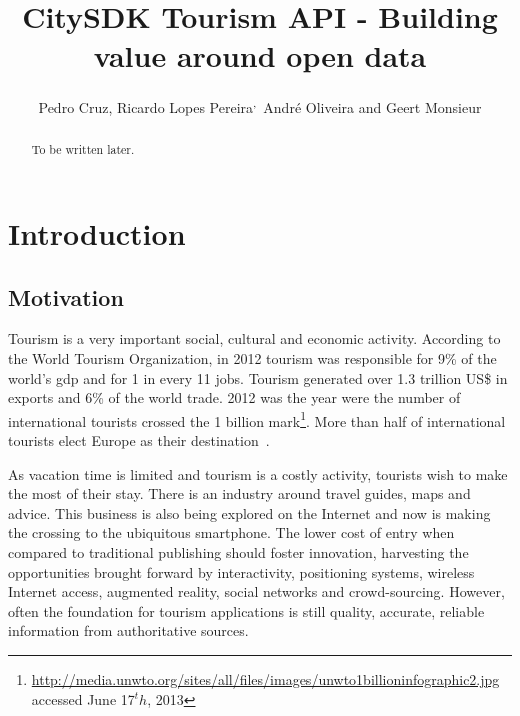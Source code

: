 \documentclass[times]{ettauth}
\begin{document}




\title{CitySDK Tourism API - Building value around open data}
\author{Pedro Cruz,
Ricardo Lopes Pereira\textsuperscript{,}\corrauth\,
Andr\'e Oliveira and 
Geert Monsieur}
\address{
 Instituto Superior T\'ecnico, Avenida Rovisco Pais 1, 1049-001 Lisboa, Portugal\\
 INESC-ID, Av. Prof. Dr. Cavaco Silva, 2744-016 Porto Salvo, Portugal\\
 ISA - Intelligent Sensing Anywhere S.A, Rua D. Manuel I, 30, 3030-320 Coimbra, Portugal\\
 European Research Institute in Service Science (ERISS), Tilburg University, Warandelaan 2, 5037AB Tilburg, The Netherlands
}

\begin{abstract}
To be written later.
\end{abstract}

\maketitle

\acresetall
\section{Introduction}

\subsection{Motivation}
\label{s:motivation}
Tourism is a very important social, cultural and economic activity.
According to the World Tourism Organization, in 2012 tourism was responsible for 9\% of the world's \ac{gdp} and for 1 in every 11 jobs.
Tourism generated over 1.3 trillion US\$ in exports and 6\% of the world trade.
2012 was the year were the number of international tourists crossed the 1 billion mark\footnote{\url{http://media.unwto.org/sites/all/files/images/unwto1billioninfographic2.jpg} accessed June 17$^th$, 2013}.
More than half of international tourists elect Europe as their destination~\cite{unwto}.

As vacation time is limited and tourism is a costly activity, tourists wish to make the most of their stay.
There is an industry around travel guides, maps and advice.
This business is also being explored on the Internet and now is making the crossing to the ubiquitous smartphone.
The lower cost of entry when compared to traditional publishing should foster innovation, harvesting the opportunities brought forward by interactivity, positioning systems, wireless Internet access, augmented reality, social networks and crowd-sourcing. 
However, often the foundation for tourism applications is still quality, accurate, reliable information from authoritative sources.
\end{document}
